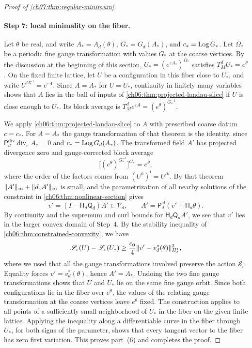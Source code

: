 \begin{proof}[Proof of \cref{ch07:thm:regular-minimum}]
\paragraph{Step 7: local minimality on the fiber.}
Let $\theta$ be real, and write $A_*=A_d(\theta)$, $G_*=G_d(A_*)$, and $c_*=\operatorname{Log} G_*$. Let $\Omega_*$ be a periodic fine gauge transformation with values $G_*$ at the coarse vertices. By the discussion at the beginning of this section, $U_*=(e^{\varepsilon A_*})^{\Omega_*}$ satisfies $T_M^dU_*=e^\theta$. On the fixed finite lattice, let $U$ be a configuration in this fiber close to $U_*$, and write $U^{\Omega_*^{-1}}=e^{\varepsilon A}$. Since $A=A_*$ for $U=U_*$, continuity in finitely many variables shows that $A$ lies in the ball of inputs of \cref{ch06:thm:projected-landau-slice} if $U$ is close enough to $U_*$. Its block average is $T_M^de^{\varepsilon A}=(e^\theta)^{G_*^{-1}}$.

We apply \cref{ch06:thm:projected-landau-slice} to $A$ with prescribed coarse datum $c=c_*$. For $A=A_*$ the gauge transformation of that theorem is the identity, since $\mathsf P_d^{\mathrm{div}}\operatorname{div}_\varepsilon A_*=0$ and $c_*=\operatorname{Log} G_d(A_*)$. The transformed field $A'$ has projected divergence zero and gauge-corrected block average
\[
 \bigl[(e^\theta)^{G_*^{-1}}\bigr]^{G_*}=e^\theta,
\]
where the order of the factors comes from $(U^k)^l=U^{lk}$. By that theorem $\lVert A'\rVert_\infty+\lVert d_\varepsilon A'\rVert_\infty$ is small, and the parametrization of all nearby solutions of the constraint in \cref{ch06:thm:nonlinear-section} gives
\[
 v'=(I-\mathsf H_d\mathsf Q_d)A'\in\mathcal V_d,\qquad A'=\mathsf P_d^{\mathrm{cl}}(v'+\mathsf H_d\theta).
\]
By continuity and the supremum and curl bounds for $\mathsf H_d\mathsf Q_dA'$, we see that $v'$ lies in the larger convex domain of Step~4. By the stability inequality of \cref{ch06:thm:constrained-convexity}, we have
\[
 \mathscr S_\varepsilon(U)-\mathscr S_\varepsilon(U_*)\ge\frac{c_0}4\lVert v'-v_d^*(\theta)\rVert_{H^1_\varepsilon}^2,
\]
where we used that all the gauge transformations involved preserve the action $\mathscr S_\varepsilon$. Equality forces $v'=v_d^*(\theta)$, hence $A'=A_*$. Undoing the two fine gauge transformations shows that $U$ and $U_*$ lie on the same fine gauge orbit. Since both configurations lie in the fiber over $e^\theta$, the values of the relating gauge transformation at the coarse vertices leave $e^\theta$ fixed. The construction applies to all points of a sufficiently small neighborhood of $U_*$ in the fiber on the given finite lattice. Applying the inequality along a differentiable curve in the fiber through $U_*$, for both signs of the parameter, shows that every tangent vector to the fiber has zero first variation. This proves part~(6) and completes the proof.
\end{proof}

